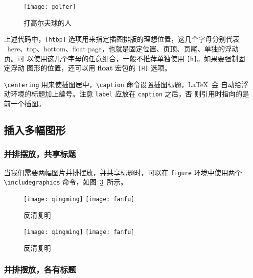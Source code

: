 \begin{code}
\begin{figure}[htbp]
\centering
\texttt{[image: golfer]}
\caption{打高尔夫球的人}
\label{fig:golfer}
\end{figure}
\end{code}

上述代码中，\verb|[htbp]| 选项用来指定插图排版的理想位置，这几个字母分别代表
~here、top、bottom、float page，也就是固定位置、页顶、页尾、单独的浮动页。可
以使用这几个字母的任意组合，一般不推荐单独使用 \verb|[h]|。如果要强制固定浮动
图形的位置，还可以用 \textbf{float} 宏包的 \verb|[H]| 选项。

\verb|\centering| 用来使插图居中，\verb|\caption| 命令设置插图标题，\LaTeX~会
自动给浮动环境的标题加上编号。注意 \verb|label| 应放在 \verb|caption| 之后，否
则引用时指向的是前一个插图。

\subsection{插入多幅图形}

\subsubsection*{并排摆放，共享标题}

当我们需要两幅图片并排摆放，并共享标题时，可以在 \texttt{figure} 环境中使用两个
\verb|\includegraphics| 命令，如图~\ref{fig:fanqingfuming}~所示。

\begin{code}
\begin{figure}[htbp]
\centering
\texttt{[image: qingming]}
\hspace{36pt}
\texttt{[image: fanfu]}
\caption{反清复明}
\label{fig:fanqingmuming}
\end{figure}
\end{code}

\begin{figure}[htbp]
\centering
\texttt{[image: qingming]}
\hspace{36pt}
\texttt{[image: fanfu]}
\caption{反清复明}
\label{fig:fanqingfuming}
\end{figure}

\subsubsection*{并排摆放，各有标题}

